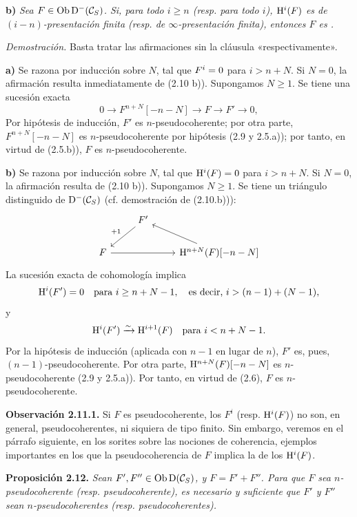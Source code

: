 \textbf{b)} \emph{Sea \(F\in\Ob\Dpx^-(\mathcal C_S)\). Si, para todo \(i\geq n\) (resp. para todo \(i\)), \(\Ho^i(F)\) es de \((i-n)\)-presentación finita (resp. de \(\infty\)-presentación finita), entonces \(F\) es .}

\emph{Demostración.} Basta tratar las afirmaciones sin la cláusula «respectivamente».

\textbf{a)} Se razona por inducción sobre \(N\), tal que \(F^i\sisi{\neq0}{=0}\) para \(i>n+N\). Si \(N=0\), la afirmación resulta inmediatamente de (2.10 b)). Supongamos \(N\geq1\). Se tiene una sucesión exacta
\[
  0\longrightarrow F^{n+N}[-n-N]\longrightarrow F\longrightarrow F'\longrightarrow 0,
\]
Por hipótesis de inducción, \(F'\) es \(n\)-pseudocoherente; por otra parte, \(F^{n+N}[-n-N]\) es \(n\)-pseudocoherente por hipótesis (2.9 y 2.5.a)); por tanto, en virtud de (2.5.b)), \(F\) es \(n\)-pseudocoherente.

\textbf{b)} Se razona por inducción sobre \(N\), tal que \(\Ho^i(F)=0\) para \(i>n+N\). Si \(N=0\), la afirmación resulta de (2.10 b)). Supongamos \(N\geq1\). Se tiene un triángulo distinguido de \(\Dpx^-(\mathcal C_S)\) (cf. demostración de (2.10.b))):
\[
\begin{tikzcd}
& F' \arrow[dl,"+1"'] & \\
F \arrow[rr] && \Ho^{n+N}(F)[-n-N] \arrow[ul]
\end{tikzcd}
\]
La sucesión exacta de cohomología implica
\[
  \Ho^i(F')=0\quad\text{para }i\geq n+N-1,\quad\text{es decir, }i>(n-1)+(N-1),
\]
y
\[
  \Ho^i(F')\qis\Ho^{i+1}(F)\quad\text{para }i<n+N-1 .
\]
Por la hipótesis de inducción (aplicada con \(n-1\) en lugar de \(n\)), \(F'\) es, pues, \((n-1)\)-pseudocoherente. Por otra parte, \(\Ho^{n+N}(F)[-n-N]\) es \(n\)-pseudocoherente (2.9 y 2.5.a)). Por tanto, en virtud de (2.6), \(F\) es \(n\)-pseudocoherente.

\textbf{Observación 2.11.1.} Si \(F\) es pseudocoherente, los \(F^i\) (resp. \(\Ho^i(F)\)) no son, en general, pseudocoherentes, ni siquiera de tipo finito. Sin embargo, veremos en el párrafo siguiente, en los sorites sobre las nociones de coherencia, ejemplos importantes en los que la pseudocoherencia de \(F\) implica la de los \(\Ho^i(F)\).

\textbf{Proposición 2.12.} \emph{Sean \(F',F''\in\Ob\Dpx(\mathcal C_S)\), y \(F=F'+F''\). Para que \(F\) sea \(n\)-pseudocoherente (resp. pseudocoherente), es necesario y suficiente que \(F'\) y \(F''\) sean \(n\)-pseudocoherentes (resp. pseudocoherentes).}

